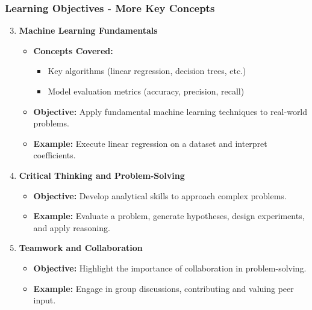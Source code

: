 \documentclass[aspectratio=169]{beamer}
\begin{document}
\begin{frame}[fragile]
    \frametitle{Learning Objectives - More Key Concepts}
    \begin{enumerate}
        \setcounter{enumi}{2}
        \item \textbf{Machine Learning Fundamentals}
        \begin{itemize}
            \item \textbf{Concepts Covered:}
            \begin{itemize}
                \item Key algorithms (linear regression, decision trees, etc.)
                \item Model evaluation metrics (accuracy, precision, recall)
            \end{itemize}
            \item \textbf{Objective:} Apply fundamental machine learning techniques to real-world problems.
            \item \textbf{Example:} Execute linear regression on a dataset and interpret coefficients.
        \end{itemize}

        \item \textbf{Critical Thinking and Problem-Solving}
        \begin{itemize}
            \item \textbf{Objective:} Develop analytical skills to approach complex problems.
            \item \textbf{Example:} Evaluate a problem, generate hypotheses, design experiments, and apply reasoning.
        \end{itemize}

        \item \textbf{Teamwork and Collaboration}
        \begin{itemize}
            \item \textbf{Objective:} Highlight the importance of collaboration in problem-solving.
            \item \textbf{Example:} Engage in group discussions, contributing and valuing peer input.
        \end{itemize}
    \end{enumerate}
\end{frame}
\end{document}
